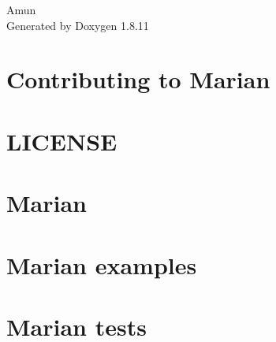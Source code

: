 \documentclass[twoside]{book}
\newcommand{\+}{\discretionary{\mbox{\scriptsize$\hookleftarrow$}}{}{}}
\newcommand{\clearemptydoublepage}{%
  \newpage{\pagestyle{empty}\cleardoublepage}%
}
\begin{document}
\hypersetup{pageanchor=false,
             bookmarksnumbered=true,
             pdfencoding=unicode
            }
\begin{titlepage}
\vspace*{7cm}
\begin{center}%
{\Large Amun }\\
\vspace*{1cm}
{\large Generated by Doxygen 1.8.11}\\
\end{center}
\end{titlepage}
\clearemptydoublepage
\tableofcontents
\clearemptydoublepage
{}
\hypersetup{pageanchor=true}

\chapter{Contributing to Marian}
\label{md__home_azadi_Desktop_Tools_marian_src_marian_contrib_README}
\hypertarget{md__home_azadi_Desktop_Tools_marian_src_marian_contrib_README}{}

\chapter{L\+I\+C\+E\+N\+SE}
\label{md__home_azadi_Desktop_Tools_marian_src_marian_LICENSE}
\hypertarget{md__home_azadi_Desktop_Tools_marian_src_marian_LICENSE}{}

\chapter{Marian}
\label{md__home_azadi_Desktop_Tools_marian_src_marian_README}
\hypertarget{md__home_azadi_Desktop_Tools_marian_src_marian_README}{}

\chapter{Marian examples}
\label{md__home_azadi_Desktop_Tools_marian_src_marian_src_examples_README}
\hypertarget{md__home_azadi_Desktop_Tools_marian_src_marian_src_examples_README}{}

\chapter{Marian tests}
\label{md__home_azadi_Desktop_Tools_marian_src_marian_src_tests_README}
\hypertarget{md__home_azadi_Desktop_Tools_marian_src_marian_src_tests_README}{}

\end{document}
